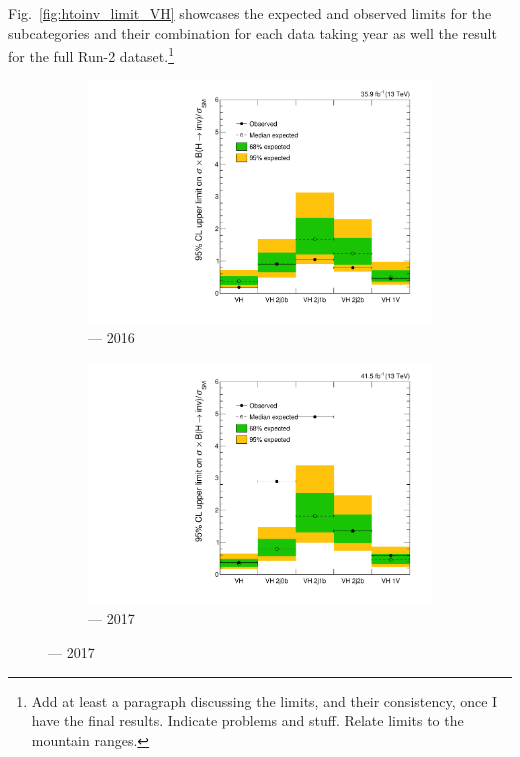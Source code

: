 Fig.~\ref{fig:htoinv_limit_VH} showcases the expected and observed limits for the \VH subcategories and their combination for each data taking year as well the result for the full Run-2 dataset.\footnote{Add at least a paragraph discussing the limits, and their consistency, once I have the final results. Indicate problems and stuff. Relate limits to the mountain ranges.}

\begin{figure}[htbp]
    \centering
    \begin{subfigure}[b]{0.45\textwidth}
        \includegraphics[width=\textwidth]{figures/limits/VH/limit_2016_VH.pdf}
        \caption{\VH --- 2016}
    \end{subfigure}
    \hfill
    \begin{subfigure}[b]{0.45\textwidth}
        \includegraphics[width=\textwidth]{figures/limits/VH/limit_2017_VH.pdf}
        \caption{\VH --- 2017}
    \end{subfigure}


\end{figure}
